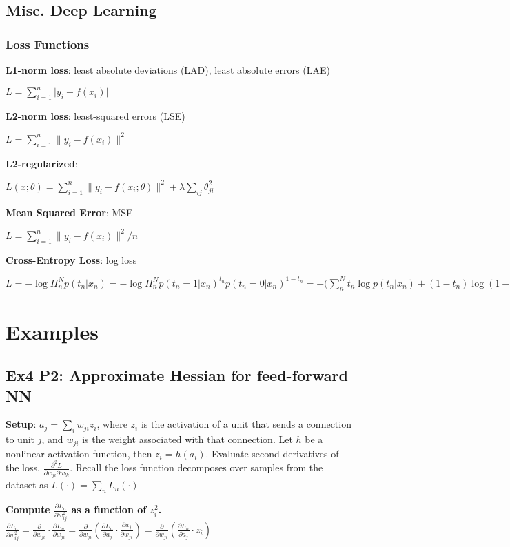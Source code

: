 \subsection*{Misc. Deep Learning}
\subsubsection*{Loss Functions}
\textbf{L1-norm loss}: least absolute deviations (LAD), least absolute errors (LAE) 

\tab $L=\sum^n_{i=1} \lvert y_i - f(x_i) \rvert$

\textbf{L2-norm loss}: least-squared errors (LSE)

\tab $L=\sum^n_{i=1} \lVert y_i - f(x_i) \rVert^2$

\textbf{L2-regularized}:

\tab $L(x;\theta)=\sum^n_{i=1} \lVert y_i - f(x_i;\theta) \rVert^2 + \lambda\sum_{ij}\theta_{ji}^2$

\textbf{Mean Squared Error}: MSE

\tab $L=\sum^n_{i=1} \lVert y_i - f(x_i) \rVert^2 / n$

\textbf{Cross-Entropy Loss}: log loss

$L=-\log\Pi^N_n p(t_n|x_n)=-\log\Pi^N_n p(t_n=1|x_n)^{t_n} p(t_n=0|x_n)^{1-t_n}=-\bigr(\sum^N_n t_n \log p(t_n|x_n) + (1-t_n) \log (1-p(t_n|x_n))\bigr)$



\section*{Examples}
\subsection*{Ex4 P2: Approximate Hessian for feed-forward NN}
\textbf{Setup}: $a_j=\sum\limits_i w_{ji}z_i$, where $z_i$ is the activation of a unit that sends a connection to unit $j$, and $w_{ji}$ is the weight associated with that connection. Let $h$ be a nonlinear activation function, then $z_i=h(a_i)$. Evaluate second derivatives of the loss, $\frac{\partial^2 L}{\partial w_{ji} \partial w_{lk}}$. Recall the loss function decomposes over samples from the dataset as $L(\cdot)=\sum_n L_n(\cdot)$

\textbf{Compute $\frac{\partial L_n}{\partial w^2_{ij}}$ as a function of $z^2_i$.}\\

\tab$\frac{\partial L_n}{\partial w^2_{ij}}=\frac{\partial}{\partial w_{ji}}\cdot \frac{\partial L_n}{\partial w_{ji}}=\frac{\partial}{\partial w_{ji}}(\frac{\partial L_n}{\partial a_j}\cdot\frac{\partial a_j}{\partial w_{ji}})=\frac{\partial}{\partial w_{ji}}(\frac{\partial L_n}{\partial a_j}\cdot z_i)$\\

